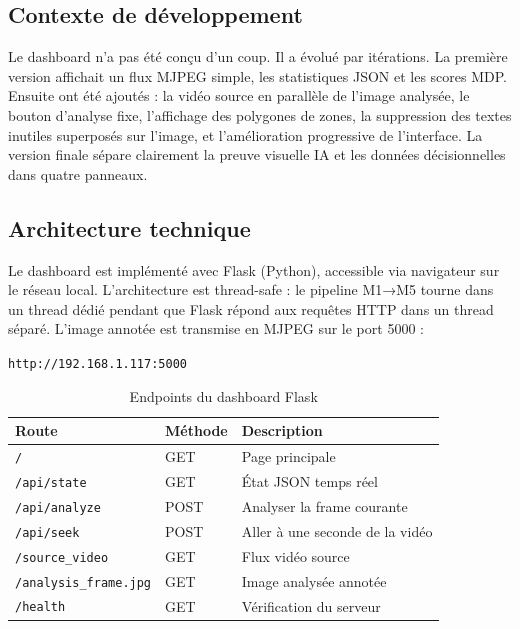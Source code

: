 \subsection{Contexte de développement}

Le dashboard n'a pas été conçu d'un coup.
Il a évolué par itérations. La première
version affichait un flux MJPEG simple,
les statistiques JSON et les scores MDP.
Ensuite ont été ajoutés : la vidéo source
en parallèle de l'image analysée, le
bouton d'analyse fixe, l'affichage des
polygones de zones, la suppression des
textes inutiles superposés sur l'image,
et l'amélioration progressive de l'interface.
La version finale sépare clairement
la preuve visuelle IA et les données
décisionnelles dans quatre panneaux.

\subsection{Architecture technique}

Le dashboard est implémenté avec Flask
(Python), accessible via navigateur
sur le réseau local. L'architecture est
thread-safe : le pipeline M1→M5 tourne
dans un thread dédié pendant que Flask
répond aux requêtes HTTP dans un thread
séparé. L'image annotée est transmise
en MJPEG sur le port 5000 :

\begin{center}
\texttt{http://192.168.1.117:5000}
\end{center}

\begin{table}[H]
\centering
\caption{Endpoints du dashboard Flask}
\begin{tabularx}{\textwidth}{llX}
\toprule
\textbf{Route} &
\textbf{Méthode} &
\textbf{Description} \\
\midrule
\texttt{/} &
GET & Page principale \\
\texttt{/api/state} &
GET & État JSON temps réel \\
\texttt{/api/analyze} &
POST & Analyser la frame courante \\
\texttt{/api/seek} &
POST & Aller à une seconde de la vidéo \\
\texttt{/source\_video} &
GET & Flux vidéo source \\
\texttt{/analysis\_frame.jpg} &
GET & Image analysée annotée \\
\texttt{/health} &
GET & Vérification du serveur \\
\bottomrule
\end{tabularx}
\label{tab:flask_endpoints}
\end{table}

